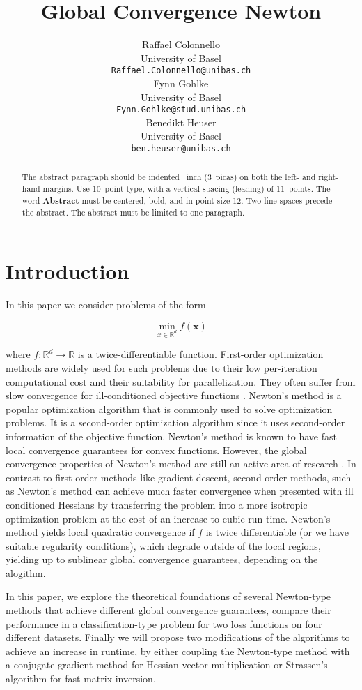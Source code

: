 \documentclass{article}
\title{Global Convergence Newton}
\author{
  Raffael Colonnello\\
  University of Basel\\
  \texttt{Raffael.Colonnello@unibas.ch} \\
  \And
  Fynn Gohlke\\
  University of Basel\\
  \texttt{Fynn.Gohlke@stud.unibas.ch} \\
  \AND
  Benedikt Heuser\\
  University of Basel\\
  \texttt{ben.heuser@unibas.ch} \\
}
\begin{document}
\maketitle


\begin{abstract}
  The abstract paragraph should be indented ~inch (3~picas) on
  both the left- and right-hand margins. Use 10~point type, with a vertical
  spacing (leading) of 11~points.  The word \textbf{Abstract} must be centered,
  bold, and in point size 12. Two line spaces precede the abstract. The abstract
  must be limited to one paragraph.
\end{abstract}

\section{Introduction}
In this paper we consider problems of the form

\begin{equation}
  \min_{x \in \mathbb{R}^d} f(\mathbf{x})
\end{equation}

where $f: \mathbb{R}^d \rightarrow \mathbb{R}$ is a twice-differentiable function. First-order optimization methods are widely used for such problems due to their low per-iteration computational cost and their suitability for parallelization. They often suffer from slow convergence for ill-conditioned objective functions \cite{wright}.
Newton's method is a popular optimization algorithm that is commonly used to solve optimization
problems. It is a second-order optimization algorithm since it uses second-order information of the
objective function. Newton's method is known to have fast local convergence guarantees for convex
functions. However, the global convergence properties of Newton's method are still an active area of
research \cite{mishchenko2023regularized} \cite{hanzely2022damped}. In contrast to first-order methods like gradient descent, second-order methods, such as Newton's method can achieve much faster convergence when presented with ill conditioned Hessians by transferring the problem into a more isotropic optimization problem at the cost of an increase to cubic run time. Newton's method yields local quadratic convergence if $f$ is twice differentiable (or we have suitable regularity conditions), which degrade outside of the local regions, yielding up to sublinear global convergence guarantees, depending on the alogithm.

In this paper, we explore the theoretical foundations of several Newton-type methods that achieve different global convergence guarantees, compare their performance in a classification-type problem for two loss functions on four different datasets.
Finally we will propose two modifications of the algorithms to achieve an increase in runtime, by either coupling the Newton-type method with a conjugate gradient method for Hessian vector multiplication or Strassen's algorithm for fast matrix inversion.
\end{document}
